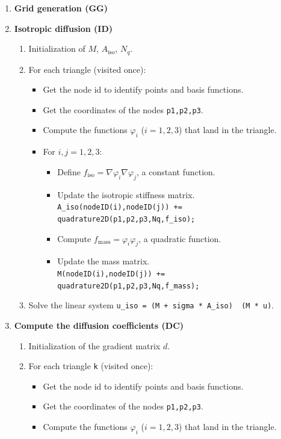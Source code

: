 \documentclass{report}
\renewcommand\phi{\varphi}
\newcommand\bslash{\symbol{`\\}}
\def\iso{\text{iso}}
\def\mass{\text{mass}}
\begin{document}
\begin{enumerate}
	\item
	\textbf{Grid generation (GG)}
	\item
	\textbf{Isotropic diffusion (ID)}
	\begin{enumerate}	
		\item 
		Initialization of $M$, $A_\iso$, $N_q$.
		\item 
		For each triangle (visited once):
		\begin{itemize}
			\item
			Get the node id to identify points and basis functions.
			\item 
			Get the coordinates of the nodes \texttt{p1,p2,p3}.
			\item 
			Compute the functions $\phi_i$ ($i=1,2,3$) that land in the triangle.
			\item 
			For $i,j=1,2,3$:
			\begin{itemize}
				\item
				Define $f_\iso = \nabla \phi_i \nabla \phi_j$, a constant function.
				\item
				Update the isotropic stiffness matrix.\\
				\texttt{A\_iso(nodeID(i),nodeID(j)) += quadrature2D(p1,p2,p3,Nq,f\_iso);}
				\item
				Compute $f_\mass = \phi_i \phi_j$, a quadratic function.
				\item
				Update the mass matrix. \\
				\texttt{M(nodeID(i),nodeID(j)) += quadrature2D(p1,p2,p3,Nq,f\_mass);}
			\end{itemize}
		\end{itemize}
		\item 
		Solve the linear system \texttt{u\_iso = (M + sigma * A\_iso) \bslash\ (M * u)}.
	\end{enumerate}
	\item
	\textbf{Compute the diffusion coefficients (DC)}
	\begin{enumerate}
		\item 
		Initialization of the gradient matrix $d$.
		\item 
		For each triangle \texttt{k} (visited once):
		\begin{itemize}
			\item
			Get the node id to identify points and basis functions.
			\item 
			Get the coordinates of the nodes \texttt{p1,p2,p3}.
			\item 
			Compute the functions $\phi_i$ ($i=1,2,3$) that land in the triangle.

\end{itemize}
\end{enumerate}
\end{enumerate}
\end{document}

